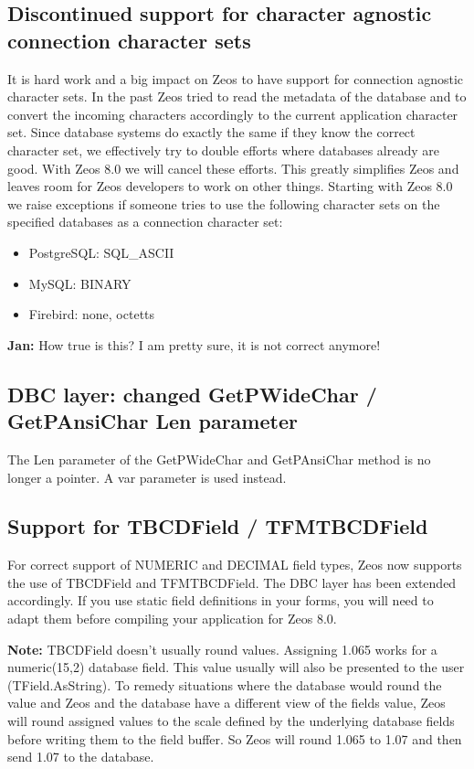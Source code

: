 \documentclass[a4paper,12pt,oneside]{article}
\begin{document}
\subsection{Discontinued support for character agnostic connection character sets}
It is hard work and a big impact on Zeos to have support for connection agnostic character sets.
In the past Zeos tried to read the metadata of the database and to convert the incoming characters accordingly to the current application character set.
Since database systems do exactly the same if they know the correct character set, we effectively try to double efforts where databases already are good.
With Zeos 8.0 we will cancel these efforts.
This greatly simplifies Zeos and leaves room for Zeos developers to work on other things.
Starting with Zeos 8.0 we raise exceptions if someone tries to use the following character sets on the specified databases as a connection character set:

\begin{itemize}
  \item 
    PostgreSQL: SQL\_ASCII
  \item
		MySQL: BINARY
	\item
    Firebird: none, octetts
\end{itemize}

\textbf{Jan:} How true is this? I am pretty sure, it is not correct anymore!

\subsection{DBC layer: changed GetPWideChar / GetPAnsiChar Len parameter}
The Len parameter of the GetPWideChar and GetPAnsiChar method is no longer a pointer.
A var parameter is used instead.

\subsection{Support for TBCDField / TFMTBCDField}
For correct support of NUMERIC and DECIMAL field types, Zeos now supports the use of TBCDField and TFMTBCDField.
The DBC layer has been extended accordingly.
If you use static field definitions in your forms, you will need to adapt them before compiling your application for Zeos 8.0.

\textbf{Note:}
TBCDField doesn't usually round values.
Assigning 1.065 works for a numeric(15,2) database field.
This value usually will also be presented to the user (TField.AsString).
To remedy situations where the database would round the value and Zeos and the database have a different view of the fields value, Zeos will round assigned values to the scale defined by the underlying database fields before writing them to the field buffer.
So Zeos will round 1.065 to 1.07 and then send 1.07 to the database.
\end{document}
